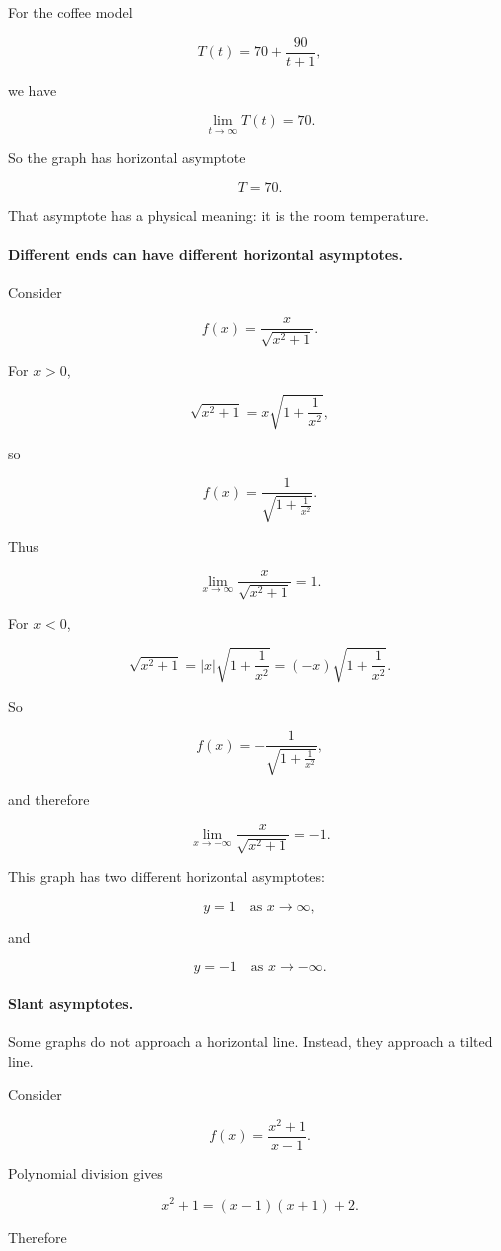 For the coffee model

\[
T(t)=70+\frac{90}{t+1},
\]

we have

\[
\lim_{t\to\infty}T(t)=70.
\]

So the graph has horizontal asymptote

\[
T=70.
\]

That asymptote has a physical meaning: it is the room temperature.

\paragraph{Different ends can have different horizontal asymptotes.}
Consider

\[
f(x)=\frac{x}{\sqrt{x^2+1}}.
\]

For \(x>0\),

\[
\sqrt{x^2+1}
=
x\sqrt{1+\frac1{x^2}},
\]

so

\[
f(x)=\frac{1}{\sqrt{1+\frac1{x^2}}}.
\]

Thus

\[
\lim_{x\to\infty}\frac{x}{\sqrt{x^2+1}}=1.
\]

For \(x<0\),

\[
\sqrt{x^2+1}
=
|x|\sqrt{1+\frac1{x^2}}
=
(-x)\sqrt{1+\frac1{x^2}}.
\]

So

\[
f(x)=
-\frac{1}{\sqrt{1+\frac1{x^2}}},
\]

and therefore

\[
\lim_{x\to-\infty}\frac{x}{\sqrt{x^2+1}}=-1.
\]

This graph has two different horizontal asymptotes:

\[
y=1
\quad\text{as }x\to\infty,
\]

and

\[
y=-1
\quad\text{as }x\to-\infty.
\]

\paragraph{Slant asymptotes.}
Some graphs do not approach a horizontal line.  Instead, they approach a tilted line.

Consider

\[
f(x)=\frac{x^2+1}{x-1}.
\]

Polynomial division gives

\[
x^2+1=(x-1)(x+1)+2.
\]

Therefore

